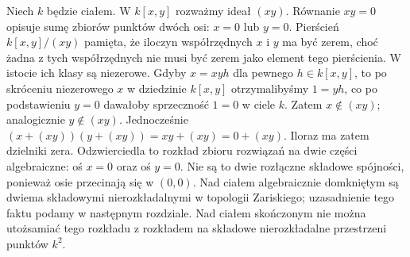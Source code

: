 \begin{przyklad}
Niech $k$ będzie ciałem. W $k[x,y]$ rozważmy ideał $(xy)$.
Równanie $xy=0$ opisuje sumę zbiorów punktów dwóch osi: $x=0$ lub $y=0$.
Pierścień $k[x,y]/(xy)$ pamięta, że iloczyn współrzędnych $x$ i $y$
ma być zerem, choć żadna z tych współrzędnych nie musi być zerem
jako element tego pierścienia.
W istocie ich klasy są niezerowe. Gdyby $x=xyh$ dla pewnego
$h\in k[x,y]$, to po skróceniu niezerowego $x$ w dziedzinie
$k[x,y]$ otrzymalibyśmy $1=yh$, co po podstawieniu $y=0$
dawałoby sprzeczność $1=0$ w ciele $k$. Zatem $x\notin(xy)$;
analogicznie $y\notin(xy)$. Jednocześnie
$(x+(xy))(y+(xy))=xy+(xy)=0+(xy)$.
Iloraz ma zatem dzielniki zera. Odzwierciedla to rozkład zbioru
rozwiązań na dwie części algebraiczne: oś $x=0$ oraz oś $y=0$.
Nie są to dwie rozłączne składowe spójności, ponieważ osie
przecinają się w $(0,0)$. Nad ciałem algebraicznie domkniętym
są dwiema składowymi nierozkładalnymi w topologii Zariskiego;
uzasadnienie tego faktu podamy w następnym rozdziale.
Nad ciałem skończonym nie można utożsamiać tego rozkładu
z rozkładem na składowe nierozkładalne przestrzeni punktów $k^2$.
\end{przyklad}

\begin{center}
\end{center}

